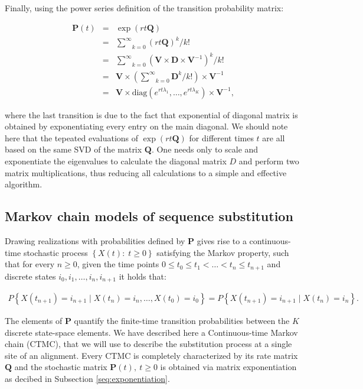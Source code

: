 \documentclass[12pt,twoside]{mitthesis}
\theoremstyle{plain}
\theoremstyle{definition}
\theoremstyle{remark}
\begin{document}
\noindent Finally, using the power series definition of the transition probability matrix: 

\begin{eqnarray}
\mathbf{P}(t) & = & \exp\left(rt\mathbf{Q}\right) \\ \nonumber
& = & \underset{k=0}{\overset{\infty}{\sum}}\left(rt\mathbf{Q}\right)^{k}/k! \\ \nonumber
& = & \underset{k=0}{\overset{\infty}{\sum}}\left(\mathbf{V}\times\mathbf{D}\times\mathbf{V}^{-1}\right)^{k}/k! \\ \nonumber
& = & \mathbf{V}\times\left(\underset{k=0}{\overset{\infty}{\sum}}\mathbf{D}^{k}/k!\right)\times\mathbf{V}^{-1} \\ \nonumber
& = & \mathbf{V}\times\text{diag}(e^{rt\lambda_{1}},\ldots,e^{rt\lambda_{K}})\times\mathbf{V}^{-1} ,
\label{eq:eigen_decomposition}
\end{eqnarray}

\noindent 
where the last transition is due to the fact that exponential of diagonal matrix is obtained by exponentiating every entry on the main diagonal.
We should note here that the tepeated evaluations of $\exp\left(rt\mathbf{Q}\right)$ for different times $t$ are all based on the same SVD of the matrix $\mathbf{Q}$. 
One needs only to scale and exponentiate the eigenvalues to calculate the diagonal matrix $D$ and perform two matrix multiplications, thus reducing all calculations to a simple and effective algorithm. 

\subsection{Markov chain models of sequence substitution}
Drawing realizations with probabilities defined by $\mathbf{P}$  gives rise to a continuous-time stochastic process $\left\{ X(t):\; t\geq0\right\}$ satisfying the Markov property, such that for every $n\geq 0$, given the time points $0\leq t_{0}\leq t_{1}<\ldots<t_{n}\leq t_{n+1}$ and discrete states $i_{0},i_{1}, \ldots, i_{n},i_{n+1}$ it holds that: 

\begin{eqnarray}
P\left\{ X(t_{n+1})=i_{n+1}\mid X(t_{n})=i_{n},\ldots, X(t_{0})=i_{0}\right\} =P\left\{ X(t_{n+1})=i_{n+1}\mid X(t_{n})=i_{n}\right\} .
\label{eq:markov}
\end{eqnarray}

The elements of $\mathbf{P}$ quantify the finite-time transition probabilities between the $K$ discrete state-space elements.
We have described here a Continuous-time Markov chain (CTMC), that we will use to describe the substitution process at a single site of an alignment.
Every CTMC is completely characterized by its rate matrix $\mathbf{Q}$ and the stochastic matrix $\mathbf{P}(t),\ t\geq0$ is obtained via matrix exponentiation as decibed in Subsection \ref{seq:exponentiation}.
\end{document}
